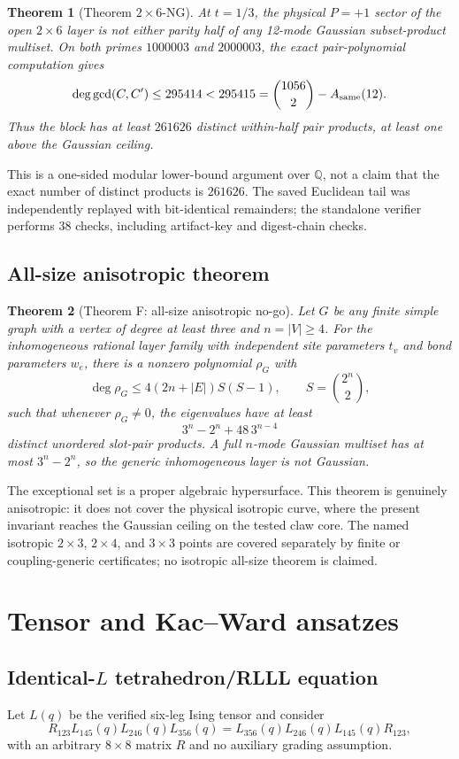 \documentclass[11pt]{article}
\newtheorem{theorem}{Theorem}[section]
\newcommand{\Q}{\mathbb Q}
\begin{document}
\begin{theorem}[Theorem $2\times6$-NG]
At $t=1/3$, the physical $P=+1$ sector of the open $2\times6$ layer is not either parity half of any 12-mode Gaussian subset-product multiset. On both primes $1000003$ and $2000003$, the exact pair-polynomial computation gives
\[
 \deg\gcd(C,C')\le295414<295415
 =\binom{1056}{2}-A_{\rm same}(12).
\]
Thus the block has at least $261626$ distinct within-half pair products, at least one above the Gaussian ceiling.
\end{theorem}

This is a one-sided modular lower-bound argument over $\Q$, not a claim that the exact number of distinct products is $261626$. The saved Euclidean tail was independently replayed with bit-identical remainders; the standalone verifier performs 38 checks, including artifact-key and digest-chain checks.

\subsection{All-size anisotropic theorem}
\begin{theorem}[Theorem F: all-size anisotropic no-go]
Let $G$ be any finite simple graph with a vertex of degree at least three and $n=|V|\ge4$. For the inhomogeneous rational layer family with independent site parameters $t_v$ and bond parameters $w_e$, there is a nonzero polynomial $\rho_G$ with
\[
 \deg\rho_G\le 4(2n+|E|)S(S-1),\qquad S=\binom{2^n}{2},
\]
such that whenever $\rho_G\neq0$, the eigenvalues have at least
\[
 3^n-2^n+48\,3^{n-4}
\]
distinct unordered slot-pair products. A full $n$-mode Gaussian multiset has at most $3^n-2^n$, so the generic inhomogeneous layer is not Gaussian.
\end{theorem}

The exceptional set is a proper algebraic hypersurface. This theorem is genuinely anisotropic: it does not cover the physical isotropic curve, where the present invariant reaches the Gaussian ceiling on the tested claw core. The named isotropic $2\times3$, $2\times4$, and $3\times3$ points are covered separately by finite or coupling-generic certificates; no isotropic all-size theorem is claimed.

\section{Tensor and Kac--Ward ansatzes}
\subsection{Identical-$L$ tetrahedron/RLLL equation}
Let $L(q)$ be the verified six-leg Ising tensor and consider
\[
 R_{123}L_{145}(q)L_{246}(q)L_{356}(q)
 =L_{356}(q)L_{246}(q)L_{145}(q)R_{123},
\]
with an arbitrary $8\times8$ matrix $R$ and no auxiliary grading assumption.
\end{document}
